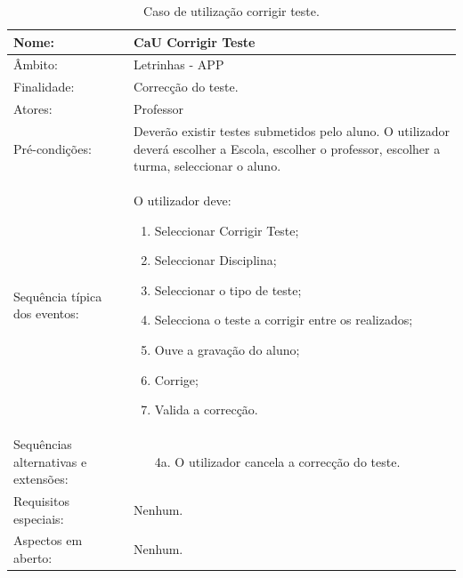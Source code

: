 \documentclass[a4paper]{article}
\begin{document}
				\newpage
				\begin {table}[h]
				\begin{tabular}{|p{2cm} p{10cm}|}
					\hline Nome: & CaU Corrigir Teste \\ 
					\hline Âmbito: & Letrinhas - APP \\ 
					\hline Finalidade: & Correcção do teste. \\ 
					\hline Atores: & Professor \\ 
				    \hline Pré-condições: & Deverão existir testes submetidos pelo  aluno.
					O utilizador deverá escolher a  Escola, escolher o professor, escolher a turma, seleccionar o aluno. \\ 
				    \hline Sequência típica dos eventos: &  					
					O utilizador deve:
				    \begin{enumerate}
				    	\item	Seleccionar Corrigir Teste;
						\item	Seleccionar Disciplina;
						\item	Seleccionar o tipo de teste;
						\item	Selecciona o teste a corrigir entre os realizados;
						\item	Ouve a gravação do aluno;
						\item	Corrige;
						\item	Valida a correcção.
				    \end{enumerate} \\ 
  				    \hline Sequências alternativas e extensões: & 
  				    \begin{enumerate}			    	
  				    	\item[4a.] O utilizador cancela a correcção do teste.
  				    \end{enumerate}
  				     \\ 
  				    \hline Requisitos especiais: & Nenhum.\\ 
  				    \hline Aspectos em aberto: & Nenhum. \\
					\hline 
				\end{tabular}
				\caption{Caso de utilização corrigir teste.}
			\end{table} 
			
		\newpage
\end{document}
